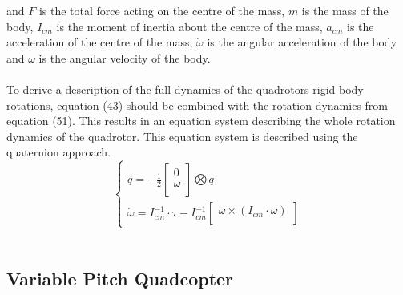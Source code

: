 and $F$ is the total force acting on the centre of the mass, $m$ is the mass of the body, $I_{cm}$ is the moment of inertia about the centre of the mass, $a_{cm}$ is the acceleration of the centre of the mass, $\dot{\omega}$ is the angular acceleration of the body and $\omega$ is the angular velocity of the body. 
\\\\
To derive a description of the full dynamics of the quadrotors rigid body rotations, equation (43) should be combined with the rotation dynamics from equation (51). This results in an equation system describing the whole rotation dynamics of the quadrotor. This equation system is described using the quaternion approach. 
\begin{equation}
  \begin{cases}
    \dot{q} = - \frac{1}{2}\begin{bmatrix}
    0 \\[0.3em]
    \omega\\[0.3em]
    \end{bmatrix}\bigotimes q\\
        \dot{\omega} = I_{cm}^{-1}\cdot\tau-I_{cm}^{-1}
    \begin{bmatrix}
    \omega \times (I_{cm}\cdot \omega)\\[0.3em]
    \end{bmatrix}
  \end{cases}
\end{equation}\\


\newpage
\subsection{Variable Pitch Quadcopter}

